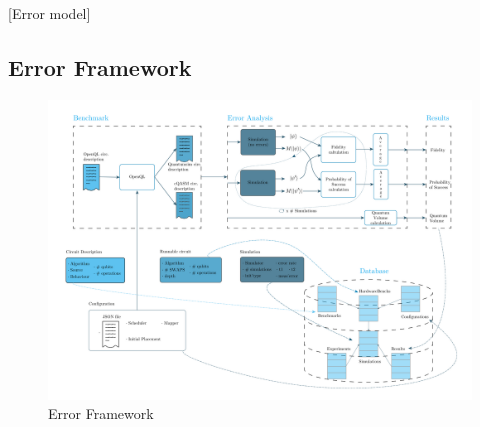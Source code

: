 [Error model]

\subsection*{Error Framework}
\label{sec:org9966e09}
\begin{figure}[htbp]
\centering
\includegraphics[width=\textwidth]{figures/error_framework_diagram.png}
\caption{\label{fig:orgc2a4b88}
Error Framework}
\end{figure}

